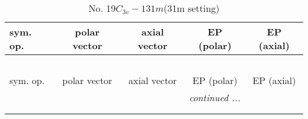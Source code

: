 \documentclass[fleqn,10pt,landscape]{jsarticle}
\begin{document}
\newpage
\begin{center}
\renewcommand{\arraystretch}{1.3}
\begin{longtable}{lcccc}
\caption{No. 19\quad$C_{3v}-1$\quad$31m$\quad(31m setting)\quad[ trigonal ]}
 \\
 \hline \hline
sym. op. & polar vector & axial vector & EP (polar) & EP (axial) \\ \hline \endfirsthead

\multicolumn{4}{l}{\tablename\ \thetable{}} \\
 \hline \hline
sym. op. & polar vector & axial vector & EP (polar) & EP (axial) \\ \hline \endhead

 \hline \hline
\multicolumn{4}{r}{\footnotesize\it continued ...} \\ \endfoot

 \hline \hline
\multicolumn{4}{r}{} \\ \endlastfoot


\end{longtable}
\end{center}
\end{document}
